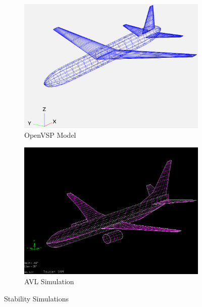 \begin{figure}[!h]
    \centering
    \begin{subfigure}{0.85\textwidth}
        \centering
        \includegraphics[width=\textwidth]{Photos/stab/openvsp.png}
        \caption{OpenVSP Model}
        \label{fig:simA}
    \end{subfigure}
    \begin{subfigure}{0.85\textwidth}
        \centering
        \includegraphics[width=\textwidth]{Photos/stab/avl.png}
        \caption{AVL Simulation}
        \label{fig:simB}
    \end{subfigure}
    \caption{Stability Simulations}
    \label{fig:sim}
\end{figure}
\clearpage

